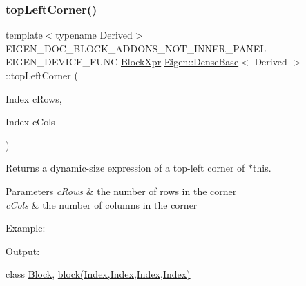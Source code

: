 \subsubsection{\texorpdfstring{topLeftCorner()}{topLeftCorner()}\hspace{0.1cm}{\footnotesize\ttfamily [1/3]}}
{\footnotesize\ttfamily template$<$typename Derived$>$ \\
E\+I\+G\+E\+N\+\_\+\+D\+O\+C\+\_\+\+B\+L\+O\+C\+K\+\_\+\+A\+D\+D\+O\+N\+S\+\_\+\+N\+O\+T\+\_\+\+I\+N\+N\+E\+R\+\_\+\+P\+A\+N\+EL E\+I\+G\+E\+N\+\_\+\+D\+E\+V\+I\+C\+E\+\_\+\+F\+U\+NC \mbox{\hyperlink{class_eigen_1_1_block}{Block\+Xpr}} \mbox{\hyperlink{class_eigen_1_1_dense_base}{Eigen\+::\+Dense\+Base}}$<$ Derived $>$\+::top\+Left\+Corner (\begin{DoxyParamCaption}\item[{Index}]{c\+Rows,  }\item[{Index}]{c\+Cols }\end{DoxyParamCaption})\hspace{0.3cm}{\ttfamily [inline]}}

\begin{DoxyReturn}{Returns}
a dynamic-\/size expression of a top-\/left corner of $\ast$this.
\end{DoxyReturn}

\begin{DoxyParams}{Parameters}
{\em c\+Rows} & the number of rows in the corner \\
\hline
{\em c\+Cols} & the number of columns in the corner\\
\hline
\end{DoxyParams}
Example\+: 
\begin{DoxyCodeInclude}{0}
\end{DoxyCodeInclude}
 Output\+: 
\begin{DoxyVerbInclude}
\end{DoxyVerbInclude}
 class \mbox{\hyperlink{class_eigen_1_1_block}{Block}}, \mbox{\hyperlink{class_eigen_1_1_dense_base_ab8e42e67c5cfd5fa13e684642f0f65bf}{block(\+Index,\+Index,\+Index,\+Index)}} \mbox{\label{class_eigen_1_1_dense_base_ae462d182957c74a99abd62967f208434}} 
